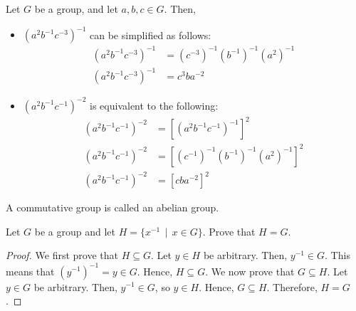 
    \begin{example}
        Let \(G\) be a group, and let \(a, b, c\in G\). Then,
        \begin{itemize}
            \item \((a^2 b^{-1} c^{-3})^{-1}\) can be simplified as follows:
            \begin{align*}
                (a^2 b^{-1} c^{-3})^{-1} &= (c^{-3})^{-1} (b^{-1})^{-1} (a^2)^{-1} \\
                (a^2 b^{-1} c^{-3})^{-1} &= c^3 ba^{-2}
            \end{align*}
            \item \((a^2 b^{-1}c^{-1})^{-2}\) is equivalent to the following:
            \begin{align*}
                (a^2 b^{-1}c^{-1})^{-2} &= \left[(a^2 b^{-1}c^{-1})^{-1}\right]^{2} \\
                (a^2 b^{-1}c^{-1})^{-2} &= \left[(c^{-1})^{-1} (b^{-1})^{-1}(a^2)^{-1}\right]^{2} \\
                (a^2 b^{-1}c^{-1})^{-2} &= \left[cba^{-2}\right]^{2}
            \end{align*}
        \end{itemize}
    \end{example}

    \begin{dfn}
        A commutative group is called an abelian group.
    \end{dfn}

    \begin{thm}
        Let \(G\) be a group and let \(H = \{x^{-1} \,\mid\, x\in G\}\). Prove that \(H = G\).
    \end{thm}

    \begin{proof}
        We first prove that \(H \subseteq G\). Let \(y\in H\) be arbitrary. Then, \(y^{-1} \in G\). This means that \((y^{-1})^{-1} = y \in G\). Hence, \(H \subseteq G\). We now prove that \(G \subseteq H\). Let \(y\in G\) be arbitrary. Then, \(y^{-1} \in G\), so \(y\in H\). Hence, \(G \subseteq H\). Therefore, \(H = G\).
    \end{proof}

